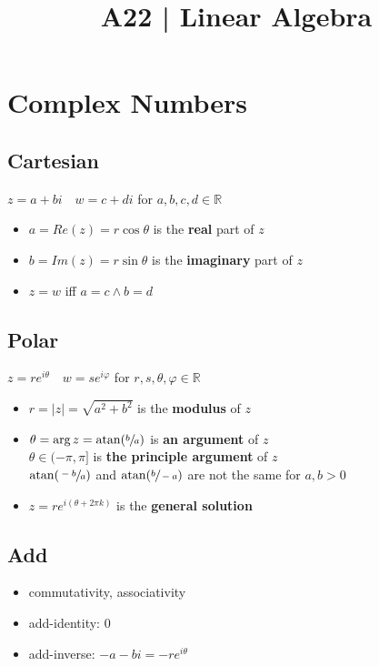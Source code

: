 

\title{A22 | Linear Algebra}


\maketitle
\tableofcontents
\section{Complex Numbers}
    \subsection{Cartesian}
		\begin{definition}
			$z=a+bi\quad w=c+di$ for $a,b,c,d\in\mathbb{R}$
			\begin{itemize}
				\item $a=Re(z)=r\cos\theta$ is the \textbf{real} part of $z$
				\item $b=Im(z)=r\sin\theta$ is the \textbf{imaginary} part of $z$
				\item $z=w$ iff $a=c\land b=d$
			\end{itemize}
		\end{definition}
	\subsection{Polar}
	    \begin{definition}
	    	$z=re^{i\theta}\quad w=se^{i\varphi}$ for $r,s,\theta,\varphi\in\mathbb{R}$
			\begin{itemize}
				\item $r=|z|=\sqrt{a^2+b^2}$ is the \textbf{modulus} of $z$
				\item $\theta=\arg z=\mathrm{atan}(\sfrac ba)$ is \textbf{an argument} of $z$\\
					$\theta\in(-\pi,\pi]$ is \textbf{the principle argument} of $z$\\
					$\mathrm{atan}(\sfrac{-b}a)$ and $\mathrm{atan}(\sfrac b{-a})$ are not the same for $a,b>0$
				\item $z=re^{i(\theta+2\pi k)}$ is the \textbf{general solution}
			\end{itemize}
	    \end{definition}
	\subsection{Add}
		\begin{definition}[$z+w=(a+c)+(c+d)i$]
			 \begin{itemize}
				\item commutativity, associativity
				\item add-identity: $0$
				\item add-inverse: $-a-bi=-re^{i\theta}$
			 \end{itemize}
		\end{definition}
